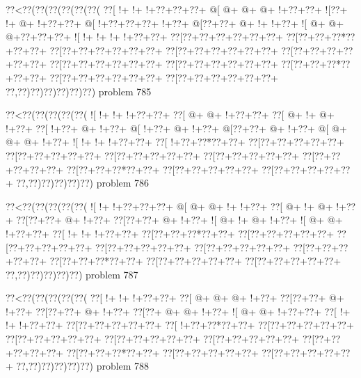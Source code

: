 \vbox{\vbox{\goo
\0??<\0??(\0??(\0??(\0??(\0??(\0??(
\0??[\- !+\- !+\- !+\0??+\0??+\0??+
\- @[\- @+\- @+\- @+\- !+\0??+\0??+
\- ![\0??+\- !+\- @+\- !+\0??+\0??+
\- @[\- !+\0??+\0??+\0??+\- !+\0??+
\- @[\0??+\0??+\- @+\- !+\- !+\0??+
\- ![\- @+\- @+\- @+\0??+\0??+\0??+
\- ![\- !+\- !+\- !+\- !+\0??+\0??+
\0??[\0??+\0??+\0??+\0??+\0??+\0??+
\0??[\0??+\0??+\0??*\0??+\0??+\0??+
\0??[\0??+\0??+\0??+\0??+\0??+\0??+
\0??[\0??+\0??+\0??+\0??+\0??+\0??+
\0??[\0??+\0??+\0??+\0??+\0??+\0??+
\0??[\0??+\0??+\0??+\0??+\0??+\0??+
\0??[\0??+\0??+\0??+\0??+\0??+\0??+
\0??[\0??+\0??+\0??*\0??+\0??+\0??+
\0??[\0??+\0??+\0??+\0??+\0??+\0??+
\0??[\0??+\0??+\0??+\0??+\0??+\0??+
\0??,\0??)\0??)\0??)\0??)\0??)\0??)
}
\hfil problem 785\hfil\break
}

\vbox{\vbox{\goo
\0??<\0??(\0??(\0??(\0??(\0??(
\- ![\- !+\- !+\- !+\0??+\0??+
\0??[\- @+\- @+\- !+\0??+\0??+
\0??[\- @+\- !+\- @+\- !+\0??+
\0??[\- !+\0??+\- @+\- !+\0??+
\- @[\- !+\0??+\- @+\- !+\0??+
\- @[\0??+\0??+\- @+\- !+\0??+
\- @[\- @+\- @+\- @+\- !+\0??+
\- ![\- !+\- !+\- !+\0??+\0??+
\0??[\- !+\0??+\0??*\0??+\0??+
\0??[\0??+\0??+\0??+\0??+\0??+
\0??[\0??+\0??+\0??+\0??+\0??+
\0??[\0??+\0??+\0??+\0??+\0??+
\0??[\0??+\0??+\0??+\0??+\0??+
\0??[\0??+\0??+\0??+\0??+\0??+
\0??[\0??+\0??+\0??*\0??+\0??+
\0??[\0??+\0??+\0??+\0??+\0??+
\0??[\0??+\0??+\0??+\0??+\0??+
\0??,\0??)\0??)\0??)\0??)\0??)
}
\hfil problem 786\hfil\break
}

\vbox{\vbox{\goo
\0??<\0??(\0??(\0??(\0??(\0??(
\- ![\- !+\- !+\0??+\0??+\0??+
\- @[\- @+\- @+\- !+\- !+\0??+
\0??[\- @+\- !+\- @+\- !+\0??+
\0??[\0??+\0??+\- @+\- !+\0??+
\0??[\0??+\0??+\- @+\- !+\0??+
\- ![\- @+\- !+\- @+\- !+\0??+
\- ![\- @+\- @+\- !+\0??+\0??+
\0??[\- !+\- !+\- !+\0??+\0??+
\0??[\0??+\0??+\0??*\0??+\0??+
\0??[\0??+\0??+\0??+\0??+\0??+
\0??[\0??+\0??+\0??+\0??+\0??+
\0??[\0??+\0??+\0??+\0??+\0??+
\0??[\0??+\0??+\0??+\0??+\0??+
\0??[\0??+\0??+\0??+\0??+\0??+
\0??[\0??+\0??+\0??*\0??+\0??+
\0??[\0??+\0??+\0??+\0??+\0??+
\0??[\0??+\0??+\0??+\0??+\0??+
\0??,\0??)\0??)\0??)\0??)\0??)
}
\hfil problem 787\hfil\break
}

\vbox{\vbox{\goo
\0??<\0??(\0??(\0??(\0??(\0??(
\0??[\- !+\- !+\- !+\0??+\0??+
\0??[\- @+\- @+\- @+\- !+\0??+
\0??[\0??+\0??+\- @+\- !+\0??+
\0??[\0??+\0??+\- @+\- !+\0??+
\0??[\0??+\- @+\- @+\- !+\0??+
\- ![\- @+\- @+\- !+\0??+\0??+
\0??[\- !+\- !+\- !+\0??+\0??+
\0??[\0??+\0??+\0??+\0??+\0??+
\0??[\- !+\0??+\0??*\0??+\0??+
\0??[\0??+\0??+\0??+\0??+\0??+
\0??[\0??+\0??+\0??+\0??+\0??+
\0??[\0??+\0??+\0??+\0??+\0??+
\0??[\0??+\0??+\0??+\0??+\0??+
\0??[\0??+\0??+\0??+\0??+\0??+
\0??[\0??+\0??+\0??*\0??+\0??+
\0??[\0??+\0??+\0??+\0??+\0??+
\0??[\0??+\0??+\0??+\0??+\0??+
\0??,\0??)\0??)\0??)\0??)\0??)
}
\hfil problem 788\hfil\break
}

